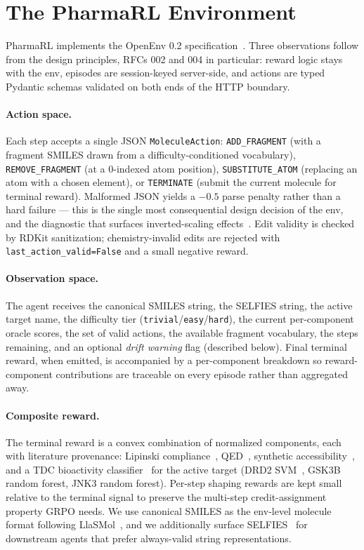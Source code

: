 \documentclass[11pt,a4paper]{article}
\begin{document}
\section{The PharmaRL Environment}

PharmaRL implements the OpenEnv 0.2 specification~\cite{metaopenenv2025}. Three observations follow from the design principles, RFCs 002 and 004 in particular: reward logic stays with the env, episodes are session-keyed server-side, and actions are typed Pydantic schemas validated on both ends of the HTTP boundary.

\paragraph{Action space.} Each step accepts a single JSON \texttt{MoleculeAction}: \texttt{ADD\_FRAGMENT} (with a fragment SMILES drawn from a difficulty-conditioned vocabulary), \texttt{REMOVE\_FRAGMENT} (at a 0-indexed atom position), \texttt{SUBSTITUTE\_ATOM} (replacing an atom with a chosen element), or \texttt{TERMINATE} (submit the current molecule for terminal reward). Malformed JSON yields a $-0.5$ parse penalty rather than a hard failure --- this is the single most consequential design decision of the env, and the diagnostic that surfaces inverted-scaling effects~\cite{mccoy2024embers}. Edit validity is checked by RDKit sanitization; chemistry-invalid edits are rejected with \texttt{last\_action\_valid=False} and a small negative reward.

\paragraph{Observation space.} The agent receives the canonical SMILES string, the SELFIES string, the active target name, the difficulty tier (\texttt{trivial}/\texttt{easy}/\texttt{hard}), the current per-component oracle scores, the set of valid actions, the available fragment vocabulary, the steps remaining, and an optional \emph{drift warning} flag (described below). Final terminal reward, when emitted, is accompanied by a per-component breakdown so reward-component contributions are traceable on every episode rather than aggregated away.

\paragraph{Composite reward.} The terminal reward is a convex combination of normalized components, each with literature provenance: Lipinski compliance~\cite{lipinski1997,veber2002}, QED~\cite{bickerton2012qed}, synthetic accessibility~\cite{ertl2009sa}, and a TDC bioactivity classifier~\cite{huang2021tdc} for the active target (DRD2 SVM~\cite{olivecrona2017reinvent}, GSK3B random forest, JNK3 random forest). Per-step shaping rewards are kept small relative to the terminal signal to preserve the multi-step credit-assignment property GRPO needs. We use canonical SMILES as the env-level molecule format following LlaSMol~\cite{yu2024llasmol}, and we additionally surface SELFIES~\cite{krenn2020selfies} for downstream agents that prefer always-valid string representations.
\end{document}
